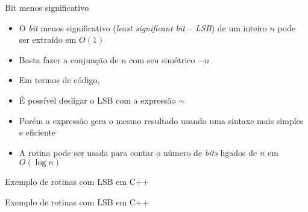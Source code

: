 \begin{frame}[fragile]{Bit menos significativo}

    \begin{itemize}
        \item O \textit{bit} menos significativo (\textit{least significant bit -- LSB}) de um 
            inteiro $n$ pode ser extraído em $O(1)$

        \item Basta fazer a conjunção de $n$ com seu simétrico $-n$

        \item Em termos de código, 

        \item É possível desligar o LSB com a expressão  $\sim$

        \item Porém a expressão  gera o mesmo resultado usando uma
            sintaxe mais simples e eficiente

        \item A rotina  pode ser usada para contar o número de \textit{bits} 
            ligados de $n$ em $O(\log n)$

    \end{itemize}

\end{frame}

\begin{frame}[fragile]{Exemplo de rotinas com LSB em C++}
\end{frame}

\begin{frame}[fragile]{Exemplo de rotinas com LSB em C++}
\end{frame}

